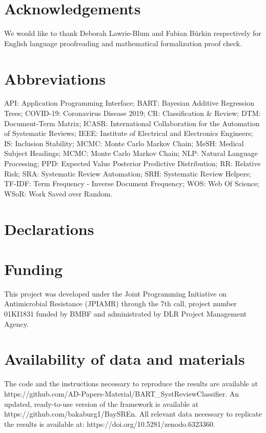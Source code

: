 \documentclass[]{bmcart}
\begin{document}
\begin{backmatter}

\section*{Acknowledgements}%
We would like to thank Deborah Lawrie-Blum and Fabian Bürkin
respectively for English language proofreading and mathematical
formalization proof check.

\section*{Abbreviations}%
API: Application Programming Interface; BART: Bayesian Additive
Regression Trees; COVID-19: Coronavirus Disease 2019; CR: Classification
\& Review; DTM: Document-Term Matrix; ICASR: International Collaboration
for the Automation of Systematic Reviews; IEEE: Institute of Electrical
and Electronics Engineers; IS: Inclusion Stability; MCMC: Monte Carlo
Markov Chain; MeSH: Medical Subject Headings; MCMC: Monte Carlo Markov
Chain; NLP: Natural Language Processing; PPD: Expected Value Posterior
Predictive Distribution; RR: Relative Risk; SRA: Systematic Review
Automation; SRH: Systematic Review Helpers; TF-IDF: Term Frequency -
Inverse Document Frequency; WOS: Web Of Science; WSoR: Work Saved over
Random.

\vspace{2em}
\section*{Declarations}
\vspace{1em}

\section*{Funding}%
This project was developed under the Joint Programming Initiative on
Antimicrobial Resistance (JPIAMR) through the 7th call, project number
01KI1831 funded by BMBF and administrated by DLR Project Management
Agency.

\section*{Availability of data and materials}%
The code and the instructions necessary to reproduce the results are
available at
https://github.com/AD-Papers-Material/BART\_SystReviewClassifier. An
updated, ready-to-use version of the framework is available at
https://github.com/bakaburg1/BaySREn. All relevant data necessary to
replicate the results is available at:
https://doi.org/10.5281/zenodo.6323360.


\end{backmatter}
\end{document}
